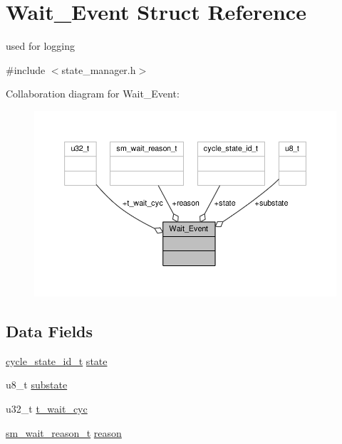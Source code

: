 \hypertarget{struct_wait___event}{}\section{Wait\+\_\+\+Event Struct Reference}
\label{struct_wait___event}


used for logging  




{\ttfamily \#include $<$state\+\_\+manager.\+h$>$}



Collaboration diagram for Wait\+\_\+\+Event\+:\nopagebreak
\begin{figure}[H]
\begin{center}
\leavevmode
\includegraphics[width=350pt]{struct_wait___event__coll__graph}
\end{center}
\end{figure}
\subsection*{Data Fields}
\begin{DoxyCompactItemize}
\item 
\hyperlink{states_8h_a9e0ef0bc98a491d55216d9485e562252}{cycle\+\_\+state\+\_\+id\+\_\+t} \hyperlink{struct_wait___event_a6ed5d93e163f36fafba6a6fa602ab3f0}{state}
\item 
u8\+\_\+t \hyperlink{struct_wait___event_aa719d2e676dc0eeaafeaae9bbc1849f0}{substate}
\item 
u32\+\_\+t \hyperlink{struct_wait___event_ac0c05f560bacae9a4ff37c4b734c9dae}{t\+\_\+wait\+\_\+cyc}
\item 
\hyperlink{state__manager_8h_ac061587bd504b89ca120f3bb56e6f4e8}{sm\+\_\+wait\+\_\+reason\+\_\+t} \hyperlink{struct_wait___event_a734736de72a0e0b0c1d7cdb3aeb38b67}{reason}
\end{DoxyCompactItemize}


